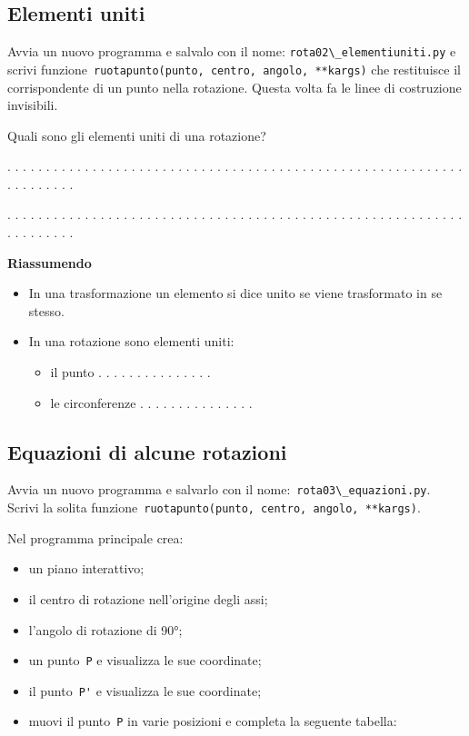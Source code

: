 \subsection{Elementi uniti}

Avvia un nuovo programma e salvalo con il nome: 
\lstinline{rota02\_elementiuniti.py}
e scrivi  funzione~\lstinline{ruotapunto(punto, centro, angolo, **kargs)} che
restituisce il corrispondente di un punto nella rotazione.
Questa volta fa le linee di costruzione invisibili.

Quali sono gli elementi uniti di una rotazione?

. . . . . . . . . . . . . . . . . . . . . . . . . . . . . . . . . . . . . . . .
. . . . . . . . . . . . . . . . . . . . . . . . . . . .

. . . . . . . . . . . . . . . . . . . . . . . . . . . . . . . . . . . . . . . .
. . . . . . . . . . . . . . . . . . . . . . . . . . . .

\newpage %

\textbf{Riassumendo}

\begin{itemize} [noitemsep]
\item In una trasformazione un elemento si dice unito se viene trasformato in se
stesso.
\item In una rotazione sono elementi uniti:
\begin{itemize} [noitemsep]
\item il punto . . . . . . . . . . . . . . .
\item le circonferenze . . . . . . . . . . . . . . .
\end{itemize}
\end{itemize}


\subsection{Equazioni di alcune rotazioni}

Avvia un nuovo programma e salvarlo con il 
nome:~\lstinline{rota03\_equazioni.py}.
Scrivi la solita 
funzione~\lstinline{ruotapunto(punto, centro, angolo, **kargs)}.

Nel programma principale crea:
\begin{itemize} [noitemsep]
\item un piano interattivo;
\item il centro di rotazione nell'origine degli assi;
\item l'angolo di rotazione di 90°;
\item un punto~\lstinline{P} e visualizza le sue coordinate;
\item il punto~\lstinline{P'} e visualizza le sue coordinate;
\item muovi il punto~\lstinline{P} in varie posizioni e completa la seguente 
 tabella:

\end{itemize}

